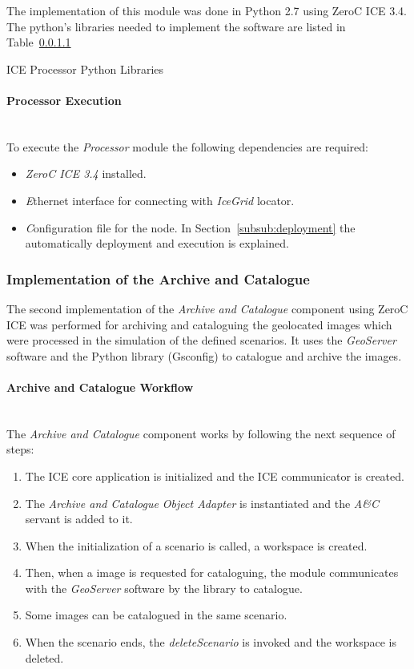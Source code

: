 The implementation of this module was done in Python 2.7 using ZeroC ICE 3.4. The
python's libraries needed to implement the software are listed in
Table~\ref{}

\begin{table}[hp]
  \centering
  {\small
  
  }
  \caption{ICE Processor Python Libraries}
  \label{table:processor-second-libraries}
\end{table}

\paragraph{Processor Execution}~\\

To execute the \emph{Processor} module the following dependencies
are required:
\begin{itemize}
\item \emph{ZeroC ICE 3.4} installed.
\item \emph Ethernet interface for connecting with \emph{IceGrid} locator.
\item \emph Configuration file for the node. In Section~\ref{subsub:deployment} the
  automatically deployment and execution is explained. 
\end{itemize}

\subsubsection{Implementation of the Archive and Catalogue}

The second implementation of the \emph{Archive and Catalogue} component using
ZeroC ICE was
performed for archiving and cataloguing the geolocated images which were
processed in the simulation of the defined scenarios. It uses the
\emph{GeoServer} software and the Python library (Gsconfig) to catalogue and
archive the images.

\paragraph{Archive and Catalogue Workflow}~\\

The \emph{Archive and Catalogue} component works by following the next sequence of steps:
\begin{enumerate}
\item The ICE core application is initialized and the ICE communicator is
  created.
\item The \emph{Archive and Catalogue Object Adapter} is instantiated and the \emph{A\&C} servant is
  added to it.
\item When the initialization of a scenario is called, a workspace is created.
\item Then, when a image is requested for cataloguing, the module communicates with the
  \emph{GeoServer} software by the library to catalogue. 
\item Some images can be catalogued in the same scenario.
\item When the scenario ends, the \emph{deleteScenario} is invoked and the
  workspace is deleted.
\end{enumerate}

